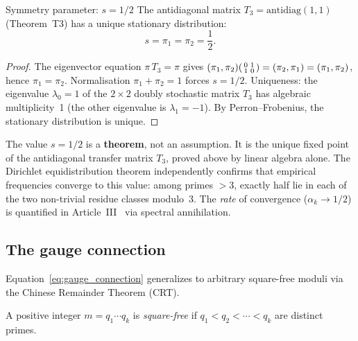 \documentclass[12pt,a4paper]{article}
\begin{document}
\mCL
\begin{thmbox}{Symmetry parameter: $s = 1/2$}
\label{thm:s_half}
The antidiagonal matrix $T_3 = \mathrm{antidiag}(1,1)$ (Theorem~T3)
has a unique stationary distribution:
\begin{equation}
  s = \pi_1 = \pi_2 = \frac{1}{2}.
  \label{eq:s_half}
\end{equation}

\begin{proof}
The eigenvector equation $\pi\,T_3 = \pi$ gives
$(\pi_1, \pi_2) \begin{psmallmatrix} 0 & 1 \\ 1 & 0 \end{psmallmatrix}
= (\pi_2, \pi_1) = (\pi_1, \pi_2)$,
hence $\pi_1 = \pi_2$.  Normalisation $\pi_1 + \pi_2 = 1$ forces
$s = 1/2$.  Uniqueness: the eigenvalue $\lambda_0 = 1$ of the
$2 \times 2$ doubly stochastic matrix $T_3$ has algebraic
multiplicity~1 (the other eigenvalue is $\lambda_1 = -1$).
By Perron--Frobenius, the stationary distribution is unique.
\end{proof}
\end{thmbox}

\begin{remark}[Epistemics of $s = 1/2$]
\label{rem:s_half}
The value $s = 1/2$ is a \textbf{theorem}, not an assumption.  It is
the unique fixed point of the antidiagonal transfer matrix $T_3$,
proved above by linear algebra alone.  The Dirichlet
equidistribution theorem independently confirms that empirical
frequencies converge to this value: among primes $> 3$, exactly half
lie in each of the two non-trivial residue classes modulo~3.
The \emph{rate} of convergence ($\alpha_k \to 1/2$) is quantified in
Article~III~\cite{companion_M3} via spectral annihilation.
\end{remark}

\subsection{The gauge connection}
\label{sec:gauge}

Equation~\eqref{eq:gauge_connection} generalizes to arbitrary square-free
moduli via the Chinese Remainder Theorem (CRT).

\begin{definition}
A positive integer $m = q_1 \cdots q_k$ is \emph{square-free} if
$q_1 < q_2 < \cdots < q_k$ are distinct primes.
\end{definition}
\end{document}
